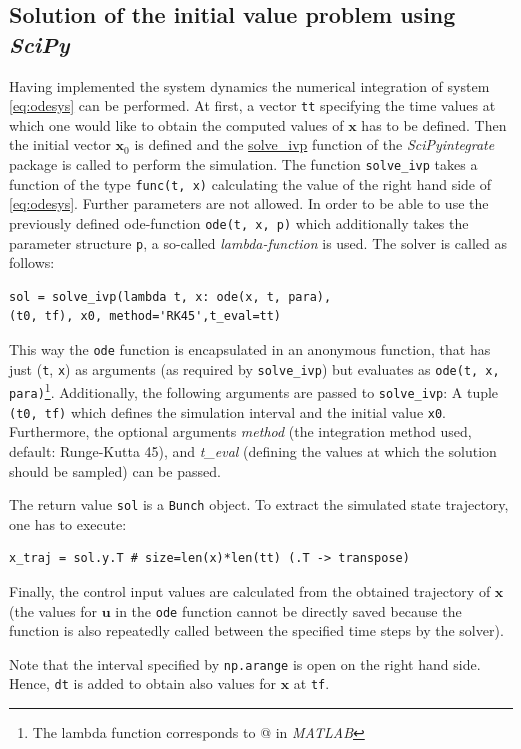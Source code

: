 \documentclass[a4paper,11pt,headinclude=true,headsepline,parskip=half,DIV=13]{scrartcl}
\newcommand{\listcode}[3]{}
\newcommand{\listcodeplot}[2]{\listcode{#1}{#2}{../sim/01_car_example_plotting.py}}
\newcommand{\scipy}{\emph{SciPy}\xspace}
\newcommand{\uu}{\mathbf{u}}
\newcommand{\x}{\mathbf{x}}
\newcommand{\xZero}{\mathbf{x}_0}
\begin{document}
\subsection{Solution of the initial value problem using \scipy}
Having implemented the system dynamics the numerical integration of system \eqref{eq:odesys} can be performed. At first, a vector \texttt{tt} specifying the time values at which one would like to obtain the computed values of $\x$ has to be defined. Then the initial vector $\xZero$ is defined and the  \href{https://docs.scipy.org/doc/scipy/reference/generated/scipy.integrate.solve_ivp.html}{solve\_ivp} function of the \scipy \emph{integrate} package is called to perform the simulation.  The function \texttt{solve\_ivp} takes a function of the type \texttt{func(t, x)} calculating the value of the right hand side of \eqref{eq:odesys}. Further parameters are not allowed. In order to be able to use the previously defined ode-function \texttt{ode(t, x, p)} which additionally takes the parameter structure \texttt{p}, a so-called \emph{lambda-function} is used. The solver is called as follows:
\begin{lstlisting}
sol = solve_ivp(lambda t, x: ode(x, t, para), 
(t0, tf), x0, method='RK45',t_eval=tt)
\end{lstlisting}
This way the \texttt{ode} function is encapsulated in an anonymous function, that has just (\texttt{t}, \texttt{x}) as arguments (as required by \texttt{solve\_ivp}) but evaluates as \texttt{ode(t, x, para)}\footnote{The lambda function corresponds to @ in \emph{MATLAB}}. Additionally, the following arguments are passed to \texttt{solve\_ivp}: A tuple \texttt{(t0, tf)} which defines the simulation interval and the initial value \texttt{x0}. Furthermore, the optional arguments \emph{method} (the integration method used, default: Runge-Kutta 45), and \emph{t\_eval} (defining the values at which the solution should be sampled) can be passed.

The return value \texttt{sol} is a \texttt{Bunch} object. To extract the simulated state trajectory, one has to execute:
\begin{lstlisting}
x_traj = sol.y.T # size=len(x)*len(tt) (.T -> transpose)
\end{lstlisting}
Finally, the control input values are calculated from the obtained trajectory of $\x$ (the values for $\uu$ in the \texttt{ode} function cannot be directly saved because the function is also repeatedly called between the specified time steps by the solver).
\listcodeplot{135}{144}
Note that the interval specified by \texttt{np.arange} is open on the right hand side. Hence, \texttt{dt} is added to obtain also values for $\x$ at \texttt{tf}. 
\end{document}

